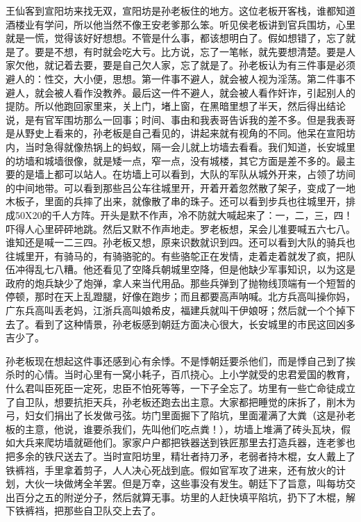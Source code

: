 王仙客到宣阳坊来找无双，宣阳坊是孙老板住的地方。这位老板开客栈，谁都知道酒楼业有学问，所以他当然不像王安老爹那么笨。听见侯老板讲到官兵围坊，心里就是一慌，觉得该好好想想。不管是什么事，都该想明白了。假如想错了，忘了就是了。要是不想，有时就会吃大亏。比方说，忘了一笔帐，就先要想清楚。要是人家欠他，就记着去要，要是自己欠人家，忘了就是了。孙老板认为有三件事是必须避人的：性交，大小便，思想。第一件事不避人，就会被人视为淫荡。第二件事不避人，就会被人看作没教养。最后这一件不避人，就会被人看作奸诈，引起别人的提防。所以他跑回家里来，关上门，堵上窗，在黑暗里想了半天，然后得出结论说，是有官军围坊那么一回事；时间、事由和我表哥告诉我的差不多。但是我表哥是从野史上看来的，孙老板是自己看见的，讲起来就有视角的不同。他呆在宣阳坊内，当时急得就像热锅上的蚂蚁，隔一会儿就上坊墙去看看。我们知道，长安城里的坊墙和城墙很像，就是矮一点，窄一点，没有城楼，其它方面是差不多的。最主要的是墙上都可以站人。在坊墙上可以看到，大队的军队从城外开来，占领了坊间的中间地带。可以看到那些吕公车往城里开，开着开着忽然散了架子，变成了一地木板子，里面的兵摔了出来，就像散了串的珠子。还可以看到步兵也往城里开，排成50X20的千人方阵。开头是默不作声，冷不防就大喊起来了：一，二，三，四！吓得人心里砰砰地跳。然后又默不作声地走。罗老板想，呆会儿准要喊五六七八。谁知还是喊一二三四。孙老板又想，原来识数就识到四。还可以看到大队的骑兵也往城里开，有骑马的，有骑骆驼的。有些骆鸵正在发情，走着走着就发了疯，把队伍冲得乱七八糟。他还看见了空降兵朝城里空降，但是他缺少军事知识，以为这是政府的炮兵缺少了炮弹，拿人来当代用品。那些兵弹到了抛物线顶端有一个短暂的停顿，那时在天上乱蹬腿，好像在跑步；而且都要高声呐喊。北方兵高叫操你妈，广东兵高叫丢老妈，江浙兵高叫娘希皮，福建兵就叫干伊娘呀；然后就一个个掉下去了。看到了这种情景，孙老板感到朝廷方面决心很大，长安城里的市民这回凶多吉少了。 

孙老板现在想起这件事还感到心有余悸。不是悸朝廷要杀他们，而是悸自己到了挨杀时的心情。当时心里有一窝小耗子，百爪挠心。上小学就受的忠君爱国的教育，什么君叫臣死臣一定死，忠臣不怕死等等，一下子全忘了。坊里有一些亡命徒成立了自卫队，想要抗拒天兵，孙老板还跑去出主意。大家都把睡觉的床拆了，削木为弓，妇女们捐出了长发做弓弦。坊门里面掘下了陷坑，里面灌满了大粪（这是孙老板的主意，他说，谁要杀我们，先叫他们吃点粪！），坊墙上堆满了砖头瓦块，假如大兵来爬坊墙就砸他们。家家户户都把铁器送到铁匠那里去打造兵器，连老爹也把多余的铁尺送去了。当时宣阳坊里，精壮者持刀矛，老弱者持木棍，女人戴上了铁裤裆，手里拿着剪子，人人决心死战到底。假如官军攻了进来，还有放火的计划，大伙一块做烤全羊罢。但是万幸，这些事没有发生。朝廷下了旨意，叫每坊交出百分之五的附逆分子，然后就算无事。坊里的人赶快填平陷坑，扔下了木棍，解下铁裤裆，把那些自卫队交上去了。 

